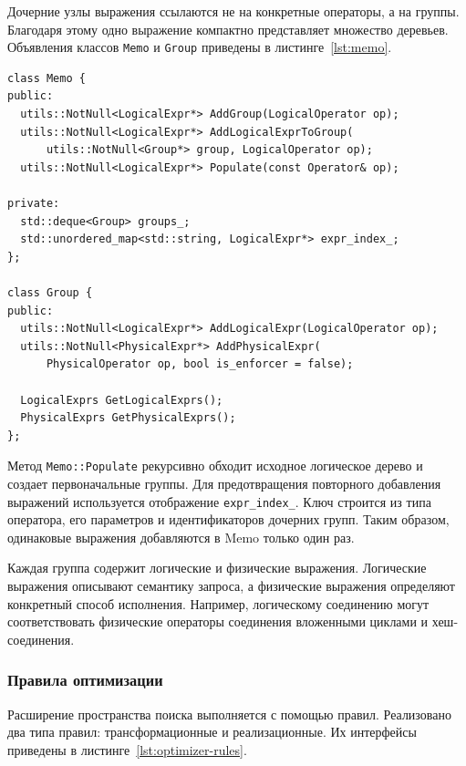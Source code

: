 \documentclass[fontsize=14pt, russian]{scrartcl}
\begin{document}
Дочерние узлы выражения ссылаются не на конкретные операторы, а на группы.
Благодаря этому одно выражение компактно представляет множество деревьев.
Объявления классов \verb|Memo| и \verb|Group| приведены в
листинге~\ref{lst:memo}.

\begin{listing}[H]
  \caption{Основные элементы структуры Memo.}
  \label{lst:memo}
  \begin{verbatim}
class Memo {
public:
  utils::NotNull<LogicalExpr*> AddGroup(LogicalOperator op);
  utils::NotNull<LogicalExpr*> AddLogicalExprToGroup(
      utils::NotNull<Group*> group, LogicalOperator op);
  utils::NotNull<LogicalExpr*> Populate(const Operator& op);

private:
  std::deque<Group> groups_;
  std::unordered_map<std::string, LogicalExpr*> expr_index_;
};

class Group {
public:
  utils::NotNull<LogicalExpr*> AddLogicalExpr(LogicalOperator op);
  utils::NotNull<PhysicalExpr*> AddPhysicalExpr(
      PhysicalOperator op, bool is_enforcer = false);

  LogicalExprs GetLogicalExprs();
  PhysicalExprs GetPhysicalExprs();
};
  \end{verbatim}
\end{listing}

Метод \verb|Memo::Populate| рекурсивно обходит исходное логическое дерево и
создает первоначальные группы. Для предотвращения повторного добавления
выражений используется отображение \verb|expr_index_|. Ключ строится из типа
оператора, его параметров и идентификаторов дочерних групп. Таким образом,
одинаковые выражения добавляются в Memo только один раз.

Каждая группа содержит логические и физические выражения. Логические выражения
описывают семантику запроса, а физические выражения определяют конкретный способ
исполнения. Например, логическому соединению могут соответствовать физические
операторы соединения вложенными циклами и хеш-соединения.

\subsubsection{Правила оптимизации}

Расширение пространства поиска выполняется с помощью правил. Реализовано два
типа правил: трансформационные и реализационные. Их интерфейсы приведены в
листинге~\ref{lst:optimizer-rules}.
\end{document}
